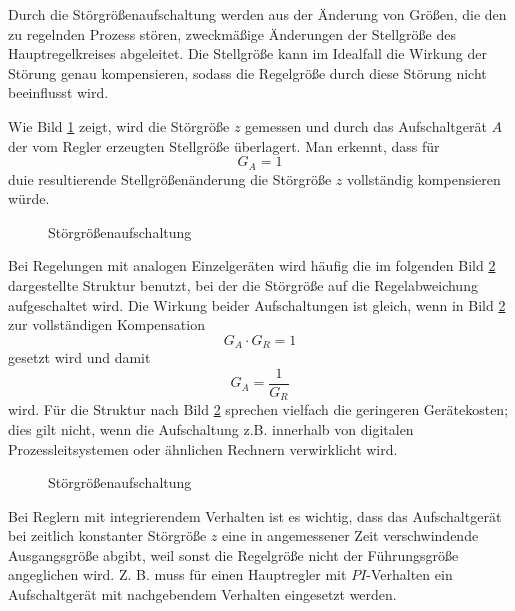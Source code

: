 Durch die Störgrößenaufschaltung werden aus der Änderung von Größen, die den zu regelnden Prozess stören, zweckmäßige Änderungen der Stellgröße des Hauptregelkreises abgeleitet.
Die Stellgröße kann im Idealfall die Wirkung der Störung genau kompensieren, sodass die Regelgröße durch diese Störung nicht beeinflusst wird.

Wie Bild \ref{fig:7-3} zeigt, wird die Störgröße \(z\) gemessen und durch das Aufschaltgerät \(A\) der vom Regler erzeugten Stellgröße überlagert.
Man erkennt, dass für
\begin{equation}
	G_A = 1
\end{equation}
duie resultierende Stellgrößenänderung die Störgröße \(z\) vollständig kompensieren würde.

\begin{figure}[ht]
    \centering
    \caption{Störgrößenaufschaltung}
    \label{fig:7-3}
\end{figure}

Bei Regelungen mit analogen Einzelgeräten wird häufig die im folgenden Bild \ref{fig:7-4} dargestellte Struktur benutzt, bei der die Störgröße auf die Regelabweichung aufgeschaltet wird.
Die Wirkung beider Aufschaltungen ist gleich, wenn in Bild \ref{fig:7-4} zur vollständigen Kompensation
\begin{equation}
	G_A \cdot G_R = 1
\end{equation}
gesetzt wird und damit
\begin{equation}
	G_A = \frac{1}{G_R}
\end{equation}
wird.
Für die Struktur nach Bild \ref{fig:7-4} sprechen vielfach die geringeren Gerätekosten; dies gilt nicht, wenn die Aufschaltung z.B. innerhalb von digitalen Prozessleitsystemen oder ähnlichen Rechnern verwirklicht wird.

\begin{figure}[ht]
    \centering
    \caption{Störgrößenaufschaltung}
    \label{fig:7-4}
\end{figure}

Bei Reglern mit integrierendem Verhalten ist es wichtig, dass das Aufschaltgerät bei zeitlich konstanter Störgröße \(z\) eine in angemessener Zeit verschwindende Ausgangsgröße abgibt, weil sonst die Regelgröße nicht der Führungsgröße angeglichen wird.
Z. B. muss für einen Hauptregler mit \(PI\)-Verhalten ein Aufschaltgerät mit nachgebendem Verhalten eingesetzt werden.

